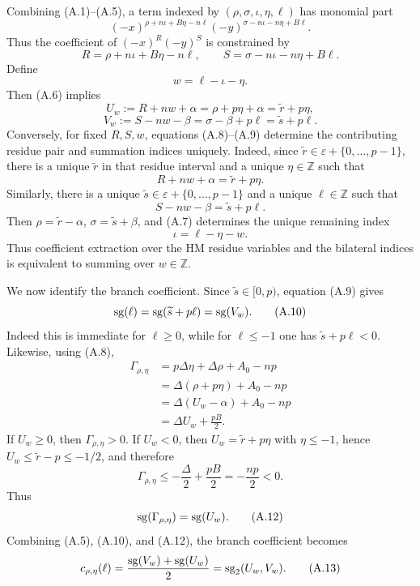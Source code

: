 Combining (A.1)--(A.5), a term indexed by
\((\rho,\sigma,\iota,\eta,\ell)\) has monomial part
\[
  (-x)^{\rho+n\iota+B\eta-n\ell}
  (-y)^{\sigma-n\iota-n\eta+B\ell}.
\]
Thus the coefficient of \((-x)^R(-y)^S\) is constrained by
\[
  R=\rho+n\iota+B\eta-n\ell,\qquad
  S=\sigma-n\iota-n\eta+B\ell.
\tag{A.6}
\]
Define
\[
  w=\ell-\iota-\eta.
\tag{A.7}
\]
Then (A.6) implies
\[
  U_w:=R+nw+\alpha=\rho+p\eta+\alpha=\widetilde r+p\eta,
\tag{A.8}
\]
\[
  V_w:=S-nw-\beta=\sigma-\beta+p\ell=\widetilde s+p\ell.
\tag{A.9}
\]
Conversely, for fixed \(R,S,w\), equations (A.8)--(A.9) determine the
contributing residue pair and summation indices uniquely.  Indeed, since
\(\widetilde r\in\varepsilon+\{0,\ldots,p-1\}\), there is a unique
\(\widetilde r\) in that residue interval and a unique \(\eta\in\mathbb Z\)
such that
\[
  R+nw+\alpha=\widetilde r+p\eta.
\]
Similarly, there is a unique \(\widetilde s\in\varepsilon+\{0,\ldots,p-1\}\)
and a unique \(\ell\in\mathbb Z\) such that
\[
  S-nw-\beta=\widetilde s+p\ell.
\]
Then \(\rho=\widetilde r-\alpha\), \(\sigma=\widetilde s+\beta\), and
(A.7) determines the unique remaining index
\[
  \iota=\ell-\eta-w.
\]
Thus coefficient extraction over the HM residue variables and the bilateral
indices is equivalent to summing over \(w\in\mathbb Z\).

We now identify the branch coefficient.  Since
\(\widetilde s\in[0,p)\), equation (A.9) gives
\[
  \operatorname{sg}(\ell)=\operatorname{sg}(\widetilde s+p\ell)=\operatorname{sg}(V_w).
\tag{A.10}
\]
Indeed this is immediate for \(\ell\ge0\), while for \(\ell\le -1\) one has
\(\widetilde s+p\ell<0\).  Likewise, using (A.8),
\[
\begin{aligned}
  \Gamma_{\rho,\eta}
  &=p\Delta\eta+\Delta\rho+A_0-np \\
  &=\Delta(\rho+p\eta)+A_0-np \\
  &=\Delta(U_w-\alpha)+A_0-np \\
  &=\Delta U_w+\frac{pB}{2}.
\end{aligned}
\tag{A.11}
\]
If \(U_w\ge0\), then \(\Gamma_{\rho,\eta}>0\).  If \(U_w<0\), then
\(U_w=\widetilde r+p\eta\) with \(\eta\le -1\), hence
\(U_w\le \widetilde r-p\le -1/2\), and therefore
\[
  \Gamma_{\rho,\eta}\le -\frac{\Delta}{2}+\frac{pB}{2}
  =-\frac{np}{2}<0.
\]
Thus
\[
  \operatorname{sg}(\Gamma_{\rho,\eta})=\operatorname{sg}(U_w).
\tag{A.12}
\]
Combining (A.5), (A.10), and (A.12), the branch coefficient becomes
\[
  c_{\rho,\eta}(\ell)
  =\frac{\operatorname{sg}(V_w)+\operatorname{sg}(U_w)}2
  =\operatorname{sg}_2(U_w,V_w).
\tag{A.13}
\]

